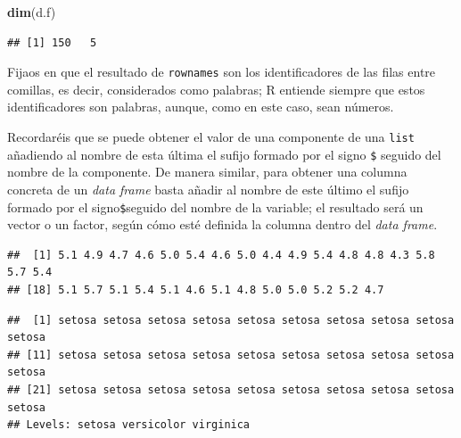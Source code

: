 \documentclass[]{book}
\newenvironment{Shaded}{\begin{snugshade}}{\end{snugshade}}
\newcommand{\DecValTok}[1]{\textcolor[rgb]{0.00,0.00,0.81}{#1}}
\newcommand{\KeywordTok}[1]{\textcolor[rgb]{0.13,0.29,0.53}{\textbf{#1}}}
\newcommand{\NormalTok}[1]{#1}
\newcommand{\OperatorTok}[1]{\textcolor[rgb]{0.81,0.36,0.00}{\textbf{#1}}}
\theoremstyle{definition}
\theoremstyle{definition}
\theoremstyle{definition}
\theoremstyle{remark}
\begin{document}
\begin{Shaded}
\begin{Highlighting}[]
\KeywordTok{dim}\NormalTok{(d.f)}
\end{Highlighting}
\end{Shaded}

\begin{verbatim}
## [1] 150   5
\end{verbatim}

Fijaos en que el resultado de \texttt{rownames} son los identificadores de las filas entre comillas, es decir, considerados como palabras; R entiende siempre que estos identificadores son palabras, aunque, como en este caso, sean números.

Recordaréis que se puede obtener el valor de una componente de una \texttt{list} añadiendo al nombre de esta última el sufijo formado por el signo \texttt{\$} seguido del nombre de la componente. De manera similar, para obtener una columna concreta de un \emph{data frame} basta añadir al nombre de este último el sufijo formado por el signo\texttt{\$}seguido del nombre de la variable; el resultado será un vector o un factor, según cómo esté definida la columna dentro del \emph{data frame}.

\begin{Shaded}
\end{Shaded}

\begin{verbatim}
##  [1] 5.1 4.9 4.7 4.6 5.0 5.4 4.6 5.0 4.4 4.9 5.4 4.8 4.8 4.3 5.8 5.7 5.4
## [18] 5.1 5.7 5.1 5.4 5.1 4.6 5.1 4.8 5.0 5.0 5.2 5.2 4.7
\end{verbatim}

\begin{Shaded}
\end{Shaded}

\begin{verbatim}
##  [1] setosa setosa setosa setosa setosa setosa setosa setosa setosa setosa
## [11] setosa setosa setosa setosa setosa setosa setosa setosa setosa setosa
## [21] setosa setosa setosa setosa setosa setosa setosa setosa setosa setosa
## Levels: setosa versicolor virginica
\end{verbatim}
\end{document}
